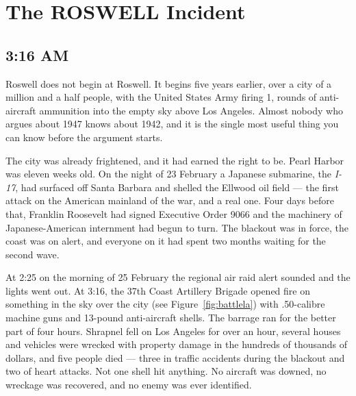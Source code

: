 \chapter{The ROSWELL Incident}\label{ch:roswell}


\section{3:16 AM}\label{sec:battlela}

Roswell does not begin at Roswell. It begins five years earlier, over a city of a million and a
half people, with the United States Army firing 1, rounds of anti-aircraft ammunition into
the empty sky above Los Angeles. Almost nobody who argues about 1947 knows about 1942, and it is
the single most useful thing you can know before the argument starts.

The city was already frightened, and it had earned the right to be. Pearl Harbor was eleven weeks
old. On the night of 23 February a Japanese submarine, the \emph{I-17}, had surfaced off Santa
Barbara and shelled the Ellwood oil field --- the first attack on the American mainland of the
war, and a real one. Four days before that, Franklin Roosevelt had signed Executive Order 9066 and
the machinery of Japanese-American internment had begun to turn. The blackout was in force, the
coast was on alert, and everyone on it had spent two months waiting for the second wave.

At 2:25 on the morning of 25 February the regional air raid alert sounded and the lights went out.
At 3:16, the 37th Coast Artillery Brigade opened fire on something in the sky over the city (see
Figure~\ref{fig:battlela}) with .50-calibre machine guns and 13-pound anti-aircraft shells. The
barrage ran for the better part of four hours. Shrapnel fell on Los Angeles for over an hour,
several houses and vehicles were wrecked with property damage in the hundreds of thousands of
dollars, and five people died --- three in traffic accidents during the blackout and two of heart
attacks. Not one shell hit anything. No aircraft was downed, no wreckage was recovered, and no
enemy was ever identified.

